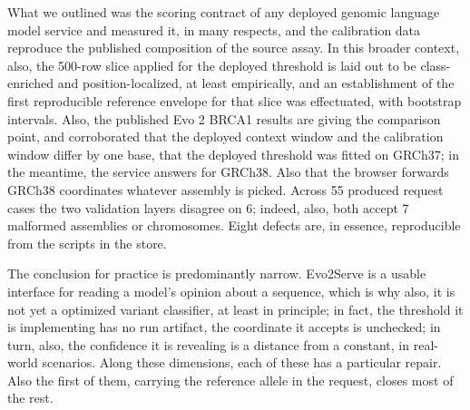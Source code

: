 \documentclass[10pt,journal]{IEEEtran}
\begin{document}
What we outlined was the scoring contract of any deployed genomic language model service and measured it, in many respects, and the calibration data reproduce the published composition of the source assay. In this broader context, also, the 500-row slice applied for the deployed threshold is laid out to be class-enriched and position-localized, at least empirically, and an establishment of the first reproducible reference envelope for that slice was effectuated, with bootstrap intervals. Also, the published Evo 2 BRCA1 results are giving the comparison point, and corroborated that the deployed context window and the calibration window differ by one base, that the deployed threshold was fitted on GRCh37; in the meantime, the service answers for GRCh38. Also that the browser forwards GRCh38 coordinates whatever assembly is picked. Across 55 produced request cases the two validation layers disagree on 6; indeed, also, both accept 7 malformed assemblies or chromosomes. Eight defects are, in essence, reproducible from the scripts in the store.

The conclusion for practice is predominantly narrow. Evo2Serve is a usable interface for reading a model's opinion about a sequence, which is why also, it is not yet a optimized variant classifier, at least in principle; in fact, the threshold it is implementing has no run artifact, the coordinate it accepts is unchecked; in turn, also, the confidence it is revealing is a distance from a constant, in real-world scenarios. Along these dimensions, each of these has a particular repair. Also the first of them, carrying the reference allele in the request, closes most of the rest.

\label{LastPage}
\end{document}
